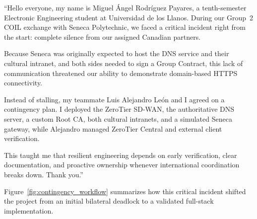 \begin{tcolorbox}[
    enhanced,
    colback=TealBg,
    colframe=TealAccent,
    boxrule=0.8pt,
    arc=4pt,
    left=10pt,
    right=10pt,
    top=8pt,
    bottom=8pt,
    title={\textbf{Continuous Oral Script (146 Spoken Words --- Approx. 60 Seconds)}},
    fonttitle=\small\bfseries,
    coltitle=white,
    colbacktitle=TealAccent
]
``Hello everyone, my name is Miguel \'Angel Rodr\'iguez Payares, a tenth-semester Electronic Engineering student at Universidad de los Llanos. During our Group~2 COIL exchange with Seneca Polytechnic, we faced a critical incident right from the start: complete silence from our assigned Canadian partners.

Because Seneca was originally expected to host the DNS service and their cultural intranet, and both sides needed to sign a Group Contract, this lack of communication threatened our ability to demonstrate domain-based HTTPS connectivity.

Instead of stalling, my teammate Luis Alejandro Le\'on and I agreed on a contingency plan. I deployed the ZeroTier SD-WAN, the authoritative DNS server, a custom Root CA, both cultural intranets, and a simulated Seneca gateway, while Alejandro managed ZeroTier Central and external client verification.

This taught me that resilient engineering depends on early verification, clear documentation, and proactive ownership whenever international coordination breaks down. Thank you.''
\end{tcolorbox}

Figure~\ref{fig:contingency_workflow} summarizes how this critical incident shifted the project from an initial bilateral deadlock to a validated full-stack implementation.


